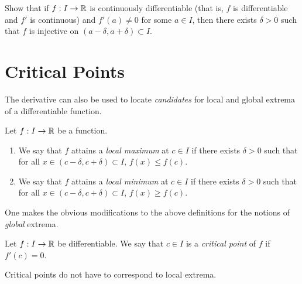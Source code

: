 \documentclass[../analysis1.tex]{subfiles}
\begin{document}
\begin{exercise*}
    Show that if $f:I\to\mathbb{R}$ is continuously differentiable (that is, $f$ is differentiable and $f'$ is continuous) and $f'(a)\ne 0$ for some $a\in I$, then there exists $\delta>0$ such that $f$ is injective on $(a-\delta,a+\delta)\subset I$. 
\end{exercise*}


\section{Critical Points}

The derivative can also be used to locate \textit{candidates} for local and global extrema of a differentiable function. 

\begin{definition}
    \begin{shaded*}
        Let $f:I\to\mathbb{R}$ be a function.
        \begin{enumerate}
            \item[1.] We say that $f$ attains a \textit{local maximum} at $c\in I$ if there exists $\delta>0$ such that for all $x\in(c-\delta,c+\delta)\subset I$, $f(x)\le f(c)$.
            \item[2.] We say that $f$ attains a \textit{local minimum} at $c\in I$ if there exists $\delta>0$ such that for all $x\in(c-\delta,c+\delta)\subset I$, $f(x)\ge f(c)$. 
        \end{enumerate}
    \end{shaded*}
\end{definition}
One makes the obvious modifications to the above definitions for the notions of \textit{global} extrema.

\begin{definition}
    \begin{shaded*}
        Let $f:I\to\mathbb{R}$ be differentiable. We say that $c\in I$ is a \textit{critical point} of $f$ if $f'(c)=0$.
    \end{shaded*}
\end{definition}
\begin{remark}
    Critical points do not have to correspond to local extrema.
\end{remark}
\end{document}

